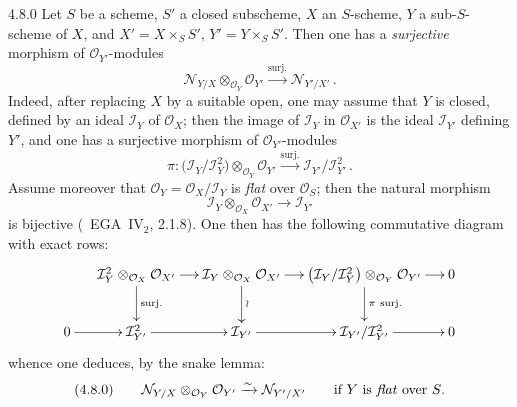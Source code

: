 \begin{remark}{4.8.0}
\label{III.4.8.0}
{\renewcommand{\thefootnote}{(89)}}
Let \(S\) be a scheme, \(S'\) a closed subscheme, \(X\) an \(S\)-scheme, \(Y\) a sub-\(S\)-scheme of \(X\), and \(X'=X\times_{S}S'\), \(Y'=Y\times_{S}S'\). Then one has a \emph{surjective} morphism of \(\mathcal{O}_{Y'}\)-modules
\[
\mathcal{N}_{Y/X}\otimes_{\mathcal{O}_{Y}}\mathcal{O}_{Y'}
\xrightarrow{\mathrm{surj.}}
\mathcal{N}_{Y'/X'}\,.
\]
Indeed, after replacing \(X\) by a suitable open, one may assume that \(Y\) is closed, defined by an ideal \(\mathcal{I}_{Y}\) of \(\mathcal{O}_{X}\); then the image of \(\mathcal{I}_{Y}\) in \(\mathcal{O}_{X'}\) is the ideal \(\mathcal{I}_{Y'}\) defining \(Y'\), and one has a surjective morphism of \(\mathcal{O}_{Y'}\)-modules
\[
\pi\colon
\bigl(\mathcal{I}_{Y}/\mathcal{I}_{Y}^{2}\bigr)\otimes_{\mathcal{O}_{Y}}\mathcal{O}_{Y'}
\xrightarrow{\mathrm{surj.}}
\mathcal{I}_{Y'}/\mathcal{I}_{Y'}^{2}\,.
\]
Assume moreover that \(\mathcal{O}_{Y}=\mathcal{O}_{X}/\mathcal{I}_{Y}\) is \emph{flat} over \(\mathcal{O}_{S}\); then the natural morphism
\[
\mathcal{I}_{Y}\otimes_{\mathcal{O}_{X}}\mathcal{O}_{X'}\longrightarrow\mathcal{I}_{Y'}
\]
is bijective (\cf\ EGA~IV\(_{2}\), 2.1.8). One then has the following commutative diagram with exact rows:
\[
\xymatrix@C=1.3em@R=2.4em{
& \mathcal{I}_{Y}^{2}\otimes_{\mathcal{O}_{X}}\mathcal{O}_{X'} \ar[r] \ar[d]^{\mathrm{surj.}}
& \mathcal{I}_{Y}\otimes_{\mathcal{O}_{X}}\mathcal{O}_{X'} \ar[r] \ar[d]^{\wr}
& \bigl(\mathcal{I}_{Y}/\mathcal{I}_{Y}^{2}\bigr)\otimes_{\mathcal{O}_{Y}}\mathcal{O}_{Y'} \ar[r] \ar[d]^{\pi\ \mathrm{surj.}}
& 0
\\
0 \ar[r]
& \mathcal{I}_{Y'}^{2} \ar[r]
& \mathcal{I}_{Y'} \ar[r]
& \mathcal{I}_{Y'}/\mathcal{I}_{Y'}^{2} \ar[r]
& 0
}
\]
whence one deduces, by the snake lemma:%
{\renewcommand{\thefootnote}{(90)}}
\[
(4.8.0)\qquad
\mathcal{N}_{Y/X}\otimes_{\mathcal{O}_{Y}}\mathcal{O}_{Y'}
\xrightarrow{\sim}
\mathcal{N}_{Y'/X'}
\qquad\text{if \(Y\) is \emph{flat} over \(S\).}
\]
\end{remark}

